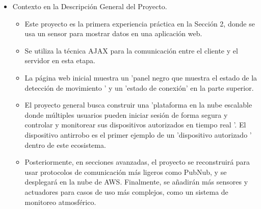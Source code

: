 \documentclass{report}
\begin{document}
\begin{itemize}
\item Contexto en la Descripción General del Proyecto.

    \begin{itemize}
        \item Este proyecto es la primera experiencia práctica en la Sección 2, donde se usa un sensor para mostrar datos en una aplicación web.
        \item Se utiliza la técnica AJAX para la comunicación entre el cliente y el servidor en esta etapa.
        \item La página web inicial muestra un  'panel negro que muestra el estado de la detección de movimiento ' y un  'estado de conexión' en la 
        parte superior.
        \item El proyecto general busca construir una  'plataforma en la nube escalable donde múltiples usuarios pueden iniciar sesión de forma segura y 
        controlar y monitorear sus dispositivos autorizados en tiempo real '. El dispositivo antirrobo es el primer ejemplo de un  'dispositivo autorizado ' 
        dentro de este ecosistema.
        \item Posteriormente, en secciones avanzadas, el proyecto se reconstruirá para usar protocolos de comunicación más ligeros como PubNub, y se desplegará 
        en la nube de AWS. Finalmente, se añadirán más sensores y actuadores para casos de uso más complejos, como un sistema de monitoreo atmosférico.
    \end{itemize}

\end{itemize}
\end{document}
